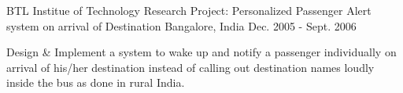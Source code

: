 \begin{cventries}
  \cventry
    {BTL Institue of Technology} %
    {Research Project: Personalized Passenger Alert system on arrival of Destination} %
    {Bangalore, India} %
    {Dec. 2005 - Sept. 2006} %
    {
      \begin{cvitems} %
      	\item {Design \& Implement a system to wake up and notify a passenger individually on arrival of his/her destination instead of calling out destination names loudly inside the bus as done in rural India.}
      \end{cvitems}
    }
    
\end{cventries}
